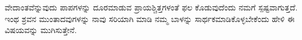 ವೇದಾಂತವೆನ್ನುವುದು ಪಾಪಗಳನ್ನು ದೂರಮಾಡುವ ಪ್ರಾಯಶ್ಚಿತ್ತಗಳಂತೆ ಫಲ ಕೊಡುವುದೆಂದು ನಮಗೆ ಸ್ಪಷ್ಟವಾಗುತ್ತದೆ. ಇಂಥ ಶ್ರವನ ಮುಂತಾದವುಗಳನ್ನು ನಾವು ಸರಿಯಾಗಿ ಮಾಡಿ ನಮ್ಮ ಬಾಳನ್ನು ಸಾರ್ಥಕಮಾಡಿಕೊಳ್ಳಬೇಕೆಂದು ಹೇಳಿ ಈ ವಿಷಯವನ್ನು ಮುಗಿಸುತ್ತೇನೆ.


















































































































